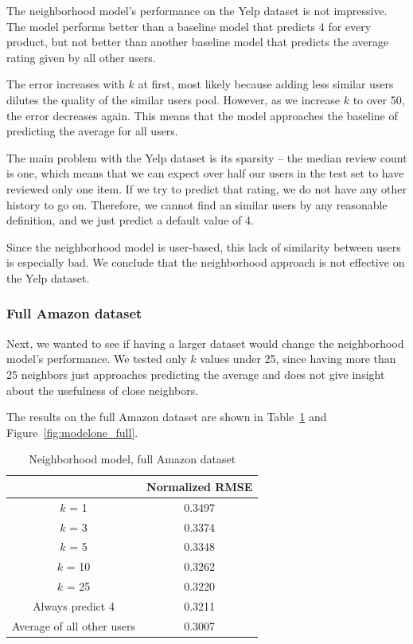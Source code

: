 \documentclass[letterpaper, 11 pt, conference]{ieeeconf}
\begin{document}
The neighborhood model's performance on the Yelp dataset is not impressive. The 
model performs better than a baseline model that predicts 4 for every product, 
but not better than another baseline model that predicts the average rating 
given by all other users. 

The error increases with $k$ at first, most likely because adding less similar 
users dilutes the quality of the similar users pool. However, as we increase 
$k$ to over 50, the error decreases again. This means that the model approaches 
the baseline of predicting the average for all users. 

The main problem with the Yelp dataset is its sparsity -- the median review 
count is one, which means that we can expect over half our users in the test 
set to have reviewed only one item. If we try to predict that rating, we 
do not have any other history to go on. Therefore, we cannot find an similar 
users by any reasonable definition, and we just predict a default value of 4. 

Since the neighborhood model is user-based, this lack of similarity between 
users is especially bad. We conclude that the neighborhood approach is not 
effective on the Yelp dataset.

\subsubsection{Full Amazon dataset}
Next, we wanted to see if having a larger dataset would change the neighborhood 
model's performance. We tested only $k$ values under 25, since having more 
than 25 neighbors just approaches predicting the average and does not give 
insight about the usefulness of close neighbors. 

The results on the full Amazon dataset 
are shown in Table~\ref{table:modelone_full} and Figure~\ref{fig:modelone_full}.

\begin{table}[htb]
\centering
\begin{tabular}{|c|c|}
\cline{2-2}

\multicolumn{1}{c|}{}  & {Normalized RMSE} \tabularnewline \hline
$k$ = 1 & 0.3497  \tabularnewline
$k$ = 3 &  0.3374 \tabularnewline
$k$ = 5 & 0.3348  \tabularnewline
$k$ = 10 & 0.3262  \tabularnewline
$k$ = 25  & 0.3220  \tabularnewline
\hline
Always predict 4 & 0.3211 \tabularnewline 
Average of all other users & 0.3007 \tabularnewline

\hline
\end{tabular}
\caption{Neighborhood model, full Amazon dataset}
\label{table:modelone_full}
\end{table}
\end{document}
